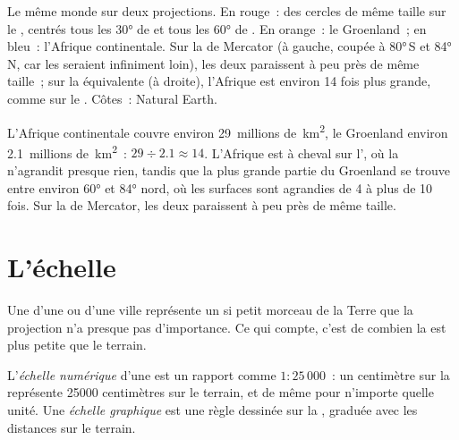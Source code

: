 \begin{omfigure}
{\small Le même monde sur deux projections. En rouge~: des cercles de même
taille sur le , centrés tous les \ang{30} de  et tous les
\ang{60} de . En orange~: le Groenland~; en bleu~: l'Afrique
continentale. Sur la  de Mercator (à gauche, coupée à \ang{80}\,S et
\ang{84}\,N, car les  seraient infiniment loin), les deux paraissent
à peu près de même taille~; sur la  équivalente (à droite), l'Afrique
est environ 14 fois plus grande, comme sur le . Côtes~: Natural
Earth.}
\label{fig:g9:maps-of-the-earth:projections}
\end{omfigure}

\begin{example}
L'Afrique continentale couvre environ 29~millions de~\unit{km^2}, le
Groenland environ 2.1~millions de~\unit{km^2}~: $29 \div 2.1 \approx 14$.
L'Afrique est à cheval sur l', où la 
n'agrandit presque rien, tandis que la plus grande partie du Groenland se
trouve entre environ \ang{60} et \ang{84} nord, où les surfaces sont
agrandies de 4 à plus de 10 fois. Sur la  de Mercator, les deux
paraissent à peu près de même taille.
\end{example}

\section{L'échelle}

Une  d'une  ou d'une ville représente un si petit morceau de la
Terre que la projection n'a presque pas d'importance. Ce qui compte, c'est
de combien la  est plus petite que le terrain.

\begin{definition}\label{def:g9:maps-of-the-earth:numerical-scale}
L'\emph{échelle numérique} d'une  est un rapport
comme $1 : 25\,000$~: un centimètre sur la  représente \num{25000}
centimètres sur le terrain, et de même pour n'importe quelle unité. Une
\emph{échelle graphique} est une règle dessinée sur la ,
graduée avec les distances sur le terrain.
\end{definition}

